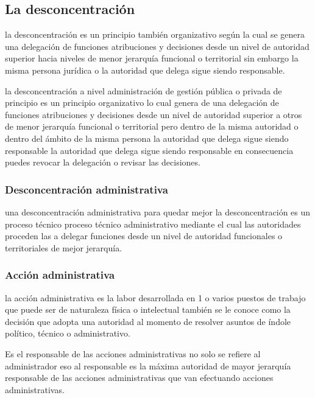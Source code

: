 \documentclass[
  letterpaper,
  DIV=11,
  numbers=noendperiod]{scrartcl}
\begin{document}
\hypertarget{la-desconcentraciuxf3n}{%
\subsection{La desconcentración}\label{la-desconcentraciuxf3n}}

la desconcentración es un principio también organizativo según la cual
se genera una delegación de funciones atribuciones y decisiones desde un
nivel de autoridad superior hacia niveles de menor jerarquía funcional o
territorial sin embargo la misma persona jurídica o la autoridad que
delega sigue siendo responsable.

la desconcentración a nivel administración de gestión pública o privada
de principio es un principio organizativo lo cual genera de una
delegación de funciones atribuciones y decisiones desde un nivel de
autoridad superior a otros de menor jerarquía funcional o territorial
pero dentro de la misma autoridad o dentro del ámbito de la misma
persona la autoridad que delega sigue siendo responsable la autoridad
que delega sigue siendo responsable en consecuencia puedes revocar la
delegación o revisar las decisiones.

\hypertarget{desconcentraciuxf3n-administrativa}{%
\subsubsection{Desconcentración
administrativa}\label{desconcentraciuxf3n-administrativa}}

una desconcentración administrativa para quedar mejor la
desconcentración es un proceso técnico proceso técnico administrativo
mediante el cual las autoridades proceden las a delegar funciones desde
un nivel de autoridad funcionales o territoriales de mejor jerarquía.

\hypertarget{acciuxf3n-administrativa}{%
\subsubsection{Acción administrativa}\label{acciuxf3n-administrativa}}

la acción administrativa es la labor desarrollada en 1 o varios puestos
de trabajo que puede ser de naturaleza física o intelectual también se
le conoce como la decisión que adopta una autoridad al momento de
resolver asuntos de índole político, técnico o administrativo.

Es el responsable de las acciones administrativas no solo se refiere al
administrador eso al responsable es la máxima autoridad de mayor
jerarquía responsable de las acciones administrativas que van efectuando
acciones administrativas.
\end{document}
